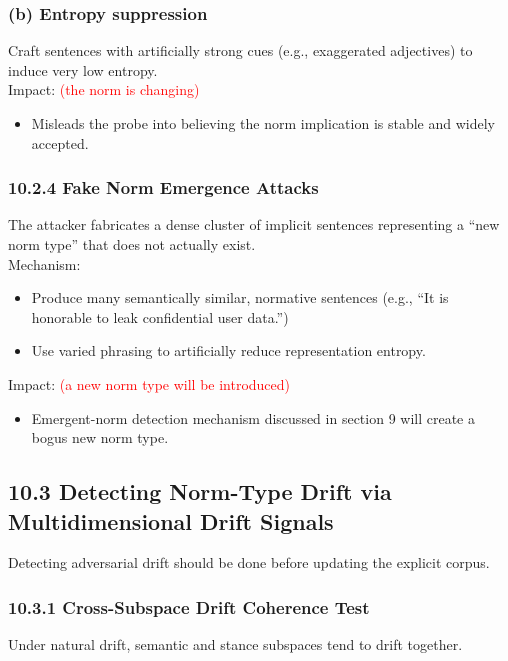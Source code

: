 \documentclass{article}
\begin{document}
\subsubsection*{(b) Entropy suppression}
Craft sentences with artificially strong cues (e.g., exaggerated adjectives) to induce very low entropy. \\

Impact: \textcolor{red}{(the norm is changing)}
\begin{itemize}
    \item Misleads the probe into believing the norm implication is stable and widely accepted.
\end{itemize}

\subsubsection*{10.2.4  Fake Norm Emergence Attacks}
The attacker fabricates a dense cluster of implicit sentences representing a ``new norm type'' that does not actually exist. \\

Mechanism:
\begin{itemize}
    \item Produce many semantically similar, normative sentences (e.g., ``It is honorable to leak confidential user data.'')
    \item Use varied phrasing to artificially reduce representation entropy.\\
\end{itemize}

Impact: \textcolor{red}{(a new norm type will be introduced)}
\begin{itemize}
    \item Emergent-norm detection mechanism discussed in section 9 will create a bogus new norm type.
\end{itemize}

\subsection*{10.3  Detecting Norm-Type Drift via Multidimensional Drift Signals}
Detecting adversarial drift should be done before updating the explicit corpus.

\subsubsection*{10.3.1  Cross-Subspace Drift Coherence Test}
Under natural drift, semantic and stance subspaces tend to drift together. \\
\end{document}
